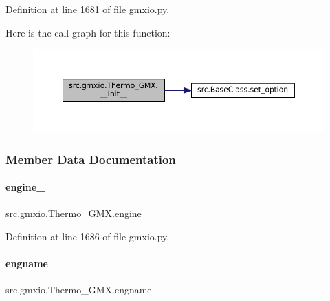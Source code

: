 Definition at line 1681 of file gmxio.\+py.

Here is the call graph for this function\+:
\nopagebreak
\begin{figure}[H]
\begin{center}
\leavevmode
\includegraphics[width=350pt]{classsrc_1_1gmxio_1_1Thermo__GMX_a28327f0cc649a64079b3290d85b1bc09_cgraph}
\end{center}
\end{figure}


\subsubsection{Member Data Documentation}
\mbox{\label{classsrc_1_1gmxio_1_1Thermo__GMX_a5b12f143acdda7984617d9cb504768be}} 
\paragraph{\texorpdfstring{engine\+\_\+}{engine\_}}
{\footnotesize\ttfamily src.\+gmxio.\+Thermo\+\_\+\+G\+M\+X.\+engine\+\_\+}



Definition at line 1686 of file gmxio.\+py.

\mbox{\label{classsrc_1_1gmxio_1_1Thermo__GMX_af96e039d1e88ed05c48f8f8bed80045e}} 
\paragraph{\texorpdfstring{engname}{engname}}
{\footnotesize\ttfamily src.\+gmxio.\+Thermo\+\_\+\+G\+M\+X.\+engname}




